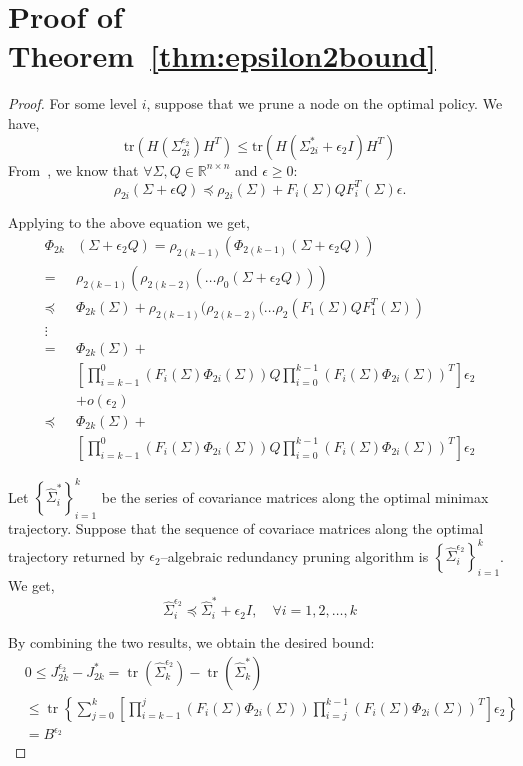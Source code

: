 \documentclass[journal]{IEEEtran}
\DeclareMathOperator{\Tr}{tr}
\begin{document}
\section{Proof of Theorem~\ref{thm:epsilon2bound}}
\begin{proof}
For some level $i$, suppose that we prune a node on the optimal policy. We have,
$$\text{tr}(H\left(\Sigma_{2i}^{\epsilon_2}\right) H^T) \le \text{tr}(H\left(\Sigma_{2i}^{*}+\epsilon_2I\right)H^T)$$ 
From~\cite{vitus2012efficient}, we know that $\forall\Sigma, Q \in \mathbb{R}^{n\times n}$ and $\epsilon \geq 0$:
$$\rho_{2i}(\Sigma+\epsilon Q)\preceq \rho_{2i}(\Sigma) + F_i(\Sigma)QF^T_i(\Sigma)\epsilon.$$

Applying to the above equation we get, 
\begin{align*}
\Phi_{2k}&(\Sigma+\epsilon_2Q) = \rho_{2(k-1)}(\Phi_{2(k-1)}(\Sigma+\epsilon_2Q))\\
=&\rho_{2(k-1)}(\rho_{2(k-2)}( \dots \rho_0(\Sigma+\epsilon_2Q)))\\
\preceq& \Phi_{2k}(\Sigma)+ \rho_{2(k-1)}(\rho_{2(k-2)}( \dots \rho_2(F_1(\Sigma)QF^T_1(\Sigma))\\
\vdots\\
=&\Phi_{2k}(\Sigma)+\\ &\left[  \prod^0_{i=k-1}\left( F_i(\Sigma) \Phi_{2i}(\Sigma)\right) Q  \prod^{k-1}_{i=0}\left(  F_i(\Sigma) \Phi_{2i}(\Sigma)\right)^T \right]\epsilon_2\\ &+o(\epsilon_2)\\
\preceq &\Phi_{2k}(\Sigma)+\\ &\left[  \prod^0_{i=k-1}\left( F_i(\Sigma) \Phi_{2i}(\Sigma)\right) Q  \prod^{k-1}_{i=0}\left(  F_i(\Sigma) \Phi_{2i}(\Sigma)\right)^T \right]\epsilon_2
\end{align*}

Let $\left\lbrace \hat{\Sigma}^\ast_i\right\rbrace^k_{i=1} $ be the series of covariance matrices along the optimal minimax trajectory. Suppose that the sequence of covariace matrices along the optimal trajectory returned by $\epsilon_2$--algebraic redundancy pruning algorithm  is  $\left\lbrace \hat{\Sigma}^{\epsilon_2}_i\right\rbrace^k_{i=1} $. We get,
$$\hat{\Sigma}^{\epsilon_2}_i \preceq \hat{\Sigma}^{\ast}_i+\epsilon_2I,\quad \forall i=1,2,\dots,k$$ 

By combining the two results, we obtain the desired bound:
\begin{align*}
&0\leq  J_{2k}^{\epsilon_2}-J_{2k}^\ast = \Tr(\hat{\Sigma}^{\epsilon_2}_k)-\Tr(\hat{\Sigma}^{\ast}_k)\\
& \leq \Tr\left\{  \sum^k_{j=0} \left[ \prod^j_{i=k-1}\left( F_i(\Sigma) \Phi_{2i}(\Sigma)\right) \prod^{k-1}_{i=j}\left(  F_i(\Sigma) \Phi_{2i}(\Sigma)\right)^T \right]\epsilon_2 
\right\} \\
&=B^{\epsilon_2}
\end{align*}
\end{proof}
\end{document}
